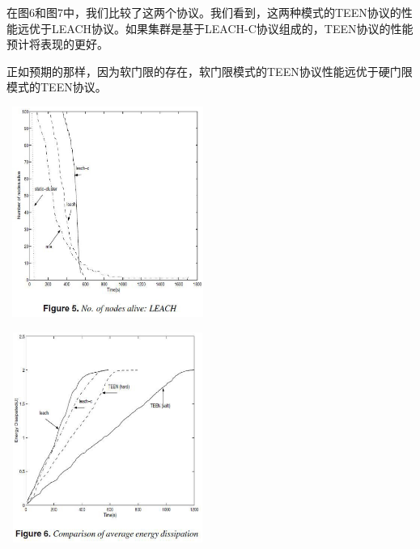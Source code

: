\documentclass[journal]{IEEEtran}
\begin{document}
\begin{CJK}{UTF8}{gbsn}
在图6和图7中，我们比较了这两个协议。我们看到，这两种模式的TEEN协议的性能远优于LEACH协议。如果集群是基于LEACH-C协议组成的，TEEN协议的性能预计将表现的更好。

正如预期的那样，因为软门限的存在，软门限模式的TEEN协议性能远优于硬门限模式的TEEN协议。

\noindent
\includegraphics[height=260, width=250]{5.eps}

\noindent
\includegraphics[height=260, width=250]{6.eps}


\end{CJK}
\end{document}
